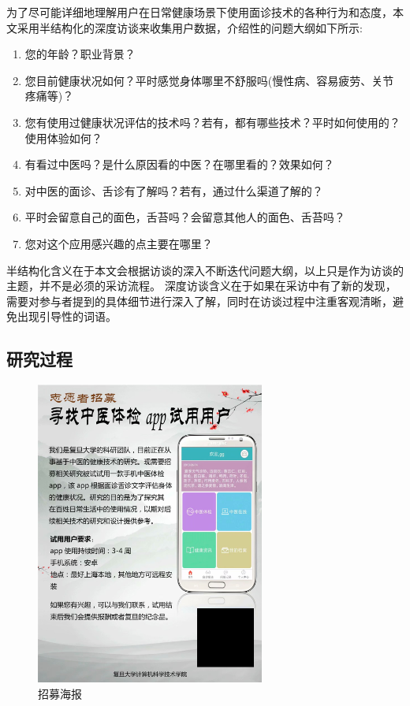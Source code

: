 为了尽可能详细地理解用户在日常健康场景下使用面诊技术的各种行为和态度，本文采用半结构化的深度访谈来收集用户数据\cite{DiciccoThe}，介绍性的问题大纲如下所示:
\begin{enumerate}
    \item 您的年龄？职业背景？
    \item 您目前健康状况如何？平时感觉身体哪里不舒服吗(慢性病、容易疲劳、关节疼痛等)？
    \item 您有使用过健康状况评估的技术吗？若有，都有哪些技术？平时如何使用的？使用体验如何？
    \item 有看过中医吗？是什么原因看的中医？在哪里看的？效果如何？
    \item 对中医的面诊、舌诊有了解吗？若有，通过什么渠道了解的？
    \item 平时会留意自己的面色，舌苔吗？会留意其他人的面色、舌苔吗？
    \item 您对这个应用感兴趣的点主要在哪里？
\end{enumerate}

半结构化含义在于本文会根据访谈的深入不断迭代问题大纲，以上只是作为访谈的主题，并不是必须的采访流程。
深度访谈含义在于如果在采访中有了新的发现，需要对参与者提到的具体细节进行深入了解，同时在访谈过程中注重客观清晰，避免出现引导性的词语。

\subsection{研究过程}
\begin{figure}[ht]
    \centering
    \includegraphics[height=10cm]{images/poster.png}
    \caption{招募海报}
    \label{fig:poster}
\end{figure}


